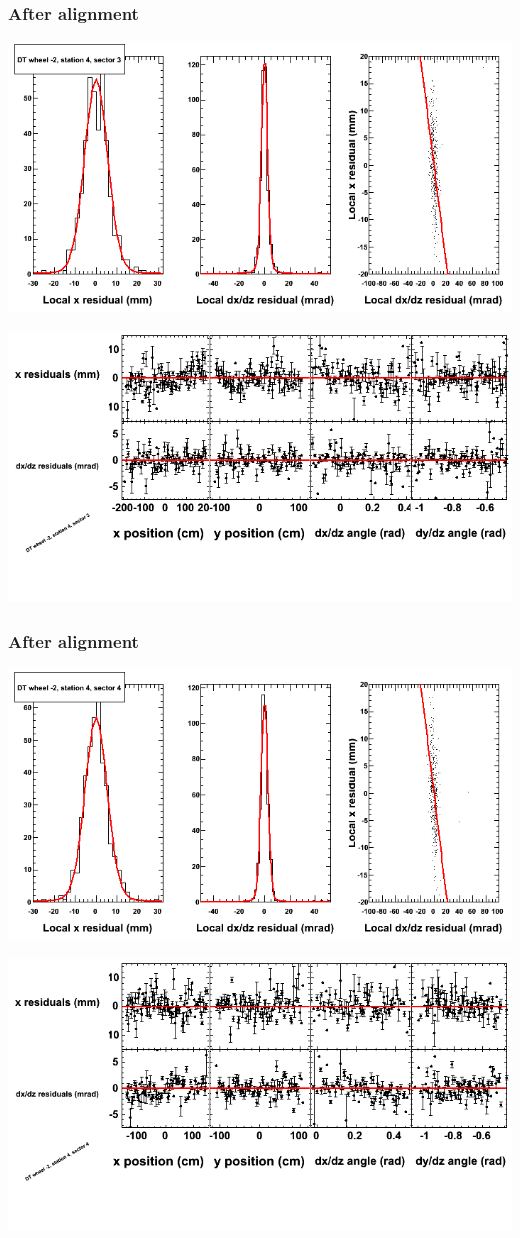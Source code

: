 \documentclass[compress]{beamer}
\begin{document}
\begin{frame}
\frametitle{After alignment}
\includegraphics[width=0.7\linewidth]{NOV4_fitfunctions/MBwhAst4sec03_bellcurves.png}

\includegraphics[width=0.7\linewidth]{NOV4_fitfunctions/MBwhAst4sec03_polynomials.png}
\end{frame}

\begin{frame}
\frametitle{After alignment}
\includegraphics[width=0.7\linewidth]{NOV4_fitfunctions/MBwhAst4sec04_bellcurves.png}

\includegraphics[width=0.7\linewidth]{NOV4_fitfunctions/MBwhAst4sec04_polynomials.png}
\end{frame}
\end{document}
